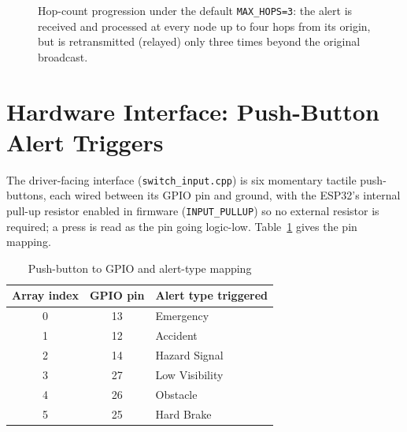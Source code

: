 \documentclass[12pt,a4paper]{report}
\begin{document}
\begin{figure}[H]
\centering
{}
\caption{Hop-count progression under the default \texttt{MAX\_HOPS=3}: the alert is received and processed at every node up to four hops from its origin, but is retransmitted (relayed) only three times beyond the original broadcast.}
\label{fig:hopchain}
\end{figure}

\section{Hardware Interface: Push-Button Alert Triggers}
The driver-facing interface (\texttt{switch\_input.cpp}) is six momentary tactile push-buttons, each wired between its GPIO pin and ground, with the ESP32's internal pull-up resistor enabled in firmware (\texttt{INPUT\_PULLUP}) so no external resistor is required; a press is read as the pin going logic-low. Table~\ref{tab:buttonpins} gives the pin mapping.

\begin{table}[H]
\centering
\caption{Push-button to GPIO and alert-type mapping}
\label{tab:buttonpins}
\begin{tabular}{@{}ccl@{}}
\toprule
\textbf{Array index} & \textbf{GPIO pin} & \textbf{Alert type triggered} \\
\midrule
0 & 13 & Emergency \\
1 & 12 & Accident \\
2 & 14 & Hazard Signal \\
3 & 27 & Low Visibility \\
4 & 26 & Obstacle \\
5 & 25 & Hard Brake \\
\bottomrule
\end{tabular}
\end{table}
\end{document}
